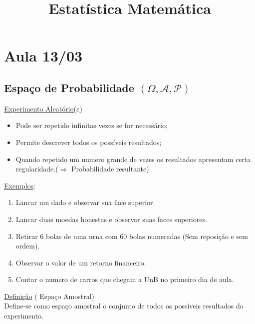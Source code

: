 \documentclass[a4paper,12pt]{article}
\author{}
\title{Estatística Matemática}
\date{}
\begin{document}
	\maketitle
	\tableofcontents	
	
	\newpage
	\section{ Aula 13/03}
	\subsection{Espaço de Probabilidade $(\Omega,\mathscr{A},\mathscr{P})$ }
\underline{Experimento Aleatório($\varepsilon$) }\\
\begin{itemize}
	\item Pode ser repetido infinitas vezes se for necessário;
	\item Permite descrever todos os possíveis resultados;
	\item Quando repetido um numero grande de vezes os resultados apresentam certa regularidade.($\Rightarrow$  Probabilidade resultante)
\end{itemize}
\underline{Exemplos}:

\begin{enumerate}[label=(\arabic*)]
	\item Lancar um dado e observar sua face superior.
	\item Lancar duas moedas honestas e observar suas faces superiores.
	\item Retirar  6 bolas de uma urna com 60 bolas numeradas (Sem reposição e sem ordem).
	\item Observar o valor de um retorno financeiro.
	\item Contar o numero de carros que chegam a UnB no primeiro dia de aula.
\end{enumerate}

\underline{Definição} ( Espaço Amostral)\\

Define-se como espaço amostral o conjunto de todos os possíveis resultados do experimento.
\\
\end{document}

